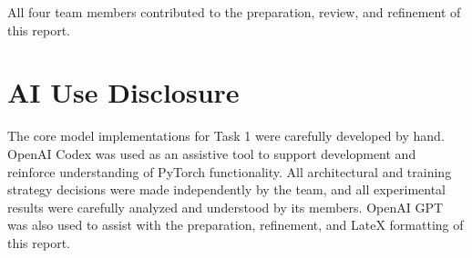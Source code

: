 \documentclass[conference]{IEEEtran}
\begin{document}
All four team members contributed to the preparation,
review, and refinement of this report.



\section{AI Use Disclosure}
\label{sec:ai_disclosure}

The core model implementations for Task 1 were carefully
developed by hand. OpenAI Codex was used as an assistive
tool to support development and reinforce understanding
of PyTorch functionality. All architectural and training
strategy decisions were made independently by the team,
and all experimental results were carefully analyzed
and understood by its members. OpenAI GPT was also used
to assist with the preparation, refinement, and
LateX formatting of this report.
\end{document}

